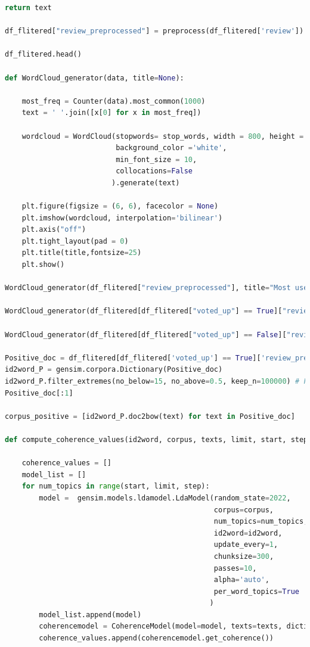 \documentclass[12pt]{article}
\begin{document}
\begin{lstlisting}[language = Python]
    return text

df_flitered["review_preprocessed"] = preprocess(df_flitered['review'])

df_flitered.head()

def WordCloud_generator(data, title=None):
    
    most_freq = Counter(data).most_common(1000) 
    text = ' '.join([x[0] for x in most_freq])
    
    wordcloud = WordCloud(stopwords= stop_words, width = 800, height = 800,
                          background_color ='white',
                          min_font_size = 10,
                          collocations=False
                         ).generate(text)
                  
    plt.figure(figsize = (6, 6), facecolor = None) 
    plt.imshow(wordcloud, interpolation='bilinear') 
    plt.axis("off") 
    plt.tight_layout(pad = 0) 
    plt.title(title,fontsize=25)
    plt.show() 
    
WordCloud_generator(df_flitered["review_preprocessed"], title="Most used words in reviews")

WordCloud_generator(df_flitered[df_flitered["voted_up"] == True]["review_preprocessed"], title="Most used words in positive reviews")

WordCloud_generator(df_flitered[df_flitered["voted_up"] == False]["review_preprocessed"], title="Most used words in negative reviews")

Positive_doc = df_flitered[df_flitered['voted_up'] == True]['review_preprocessed'].apply(lambda x: x.split()).tolist()
id2word_P = gensim.corpora.Dictionary(Positive_doc)
id2word_P.filter_extremes(no_below=15, no_above=0.5, keep_n=100000) # Filt extreme words
Positive_doc[:1]

corpus_positive = [id2word_P.doc2bow(text) for text in Positive_doc]

def compute_coherence_values(id2word, corpus, texts, limit, start, step):
    
    coherence_values = []
    model_list = []
    for num_topics in range(start, limit, step):
        model =  gensim.models.ldamodel.LdaModel(random_state=2022, 
                                                 corpus=corpus, 
                                                 num_topics=num_topics, 
                                                 id2word=id2word,
                                                 update_every=1,
                                                 chunksize=300,
                                                 passes=10,
                                                 alpha='auto',
                                                 per_word_topics=True
                                                )
        model_list.append(model)
        coherencemodel = CoherenceModel(model=model, texts=texts, dictionary=id2word, coherence='c_v')
        coherence_values.append(coherencemodel.get_coherence())


\end{lstlisting}
\end{document}
